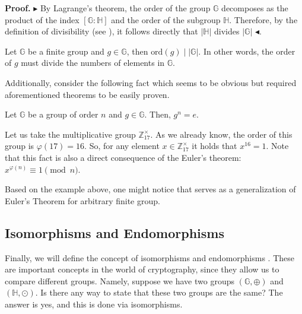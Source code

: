 \documentclass[../lecture-notes-148x210.tex]{subfiles}
\begin{document}
\textbf{Proof.} $\blacktriangleright$ By Lagrange's theorem, the order of the group $\mathbb{G}$ 
decomposes as the product of the index $\left[ \mathbb{G} : \mathbb{H} \right]$ and the order of the 
subgroup $\mathbb{H}$. Therefore, by the definition of divisibility (see ), 
it follows directly that $\left| \mathbb{H} \right|$ divides $\left| \mathbb{G} \right|$ $\blacktriangleleft$.

\begin{corollary}
    Let $\mathbb{G}$ be a finite group and $g \in \mathbb{G}$, 
    then $\text{ord}(g) \mid \left| \mathbb{G} \right|$. In other words, the order of $g$ must 
    divide the numbers of elements in $\mathbb{G}$. 
\end{corollary}

Additionally, consider the following fact which seems to be obvious but required aforementioned 
theorems to be easily proven.

\begin{corollary}\label{corollary:group-exp}
    Let $\mathbb{G}$ be a group of order $n$ and $g \in \mathbb{G}$. Then,
    $g^{n} = e$.
\end{corollary}

\begin{example}
    Let us take the multiplicative group $\mathbb{Z}_{17}^{\times}$. As we
    already know, the order of this group is $\varphi(17) = 16$. So, for any
    element $x \in \mathbb{Z}_{17}^{\times}$ it holds that $x^{16} = 1$. Note
    that this fact is also a direct consequence of the Euler's theorem:
    $x^{\varphi(n)} \equiv 1 \pmod{n}$.
\end{example}

Based on the example above, one might notice that 
serves as a generalization of Euler's Theorem for arbitrary finite group.

\subsection{Isomorphisms and Endomorphisms}

Finally, we will define the concept of isomorphisms and endomorphisms \cite[section 9]{Judson_2012}. These are important concepts in the world of cryptography, since they allow us to compare different groups. Namely, 
suppose we have two groups $(\mathbb{G},\oplus)$ and $(\mathbb{H}, \odot)$. Is there any way to state that these two groups are the same? The answer is yes, and this is done via isomorphisms.
\end{document}
